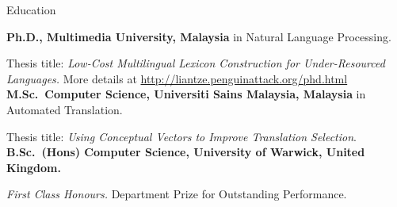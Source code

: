 \begin{rubric}{Education}

\entry*[2009 -- 2013]%
	\textbf{Ph.D., Multimedia University, Malaysia} in Natural Language Processing.
	\par Thesis title: \emph{Low-Cost Multilingual Lexicon Construction for Under-Resourced Languages.} More details at \url{http://liantze.penguinattack.org/phd.html}
%
\entry*[2003 -- 2006]%
	\textbf{M.Sc.~Computer Science, Universiti Sains Malaysia, Malaysia} in Automated Translation.\par
	Thesis title: \emph{Using Conceptual Vectors to Improve Translation Selection}.
%
\entry*[1998 -- 2001]%
	\textbf{B.Sc.~(Hons) Computer Science, University of Warwick, United Kingdom.}\par
	\emph{First Class Honours.}  Department Prize for Outstanding Performance.
%
\end{rubric}
